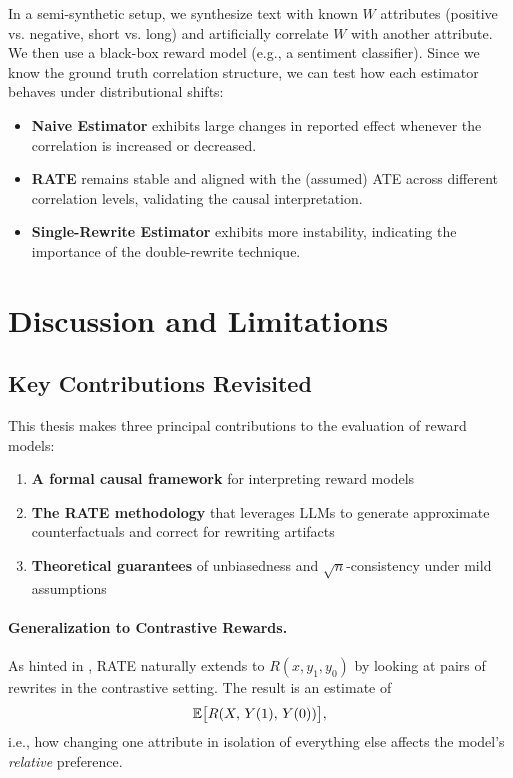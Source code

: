In a semi-synthetic setup, we synthesize text with known $W$ attributes (positive vs. negative, short vs. long) and artificially correlate $W$ with another attribute. We then use a black-box reward model (e.g., a sentiment classifier). Since we know the ground truth correlation structure, we can test how each estimator behaves under distributional shifts:
\begin{itemize}
    \item \textbf{Naive Estimator} exhibits large changes in reported effect whenever the correlation is increased or decreased.
    \item \textbf{RATE} remains stable and aligned with the (assumed) ATE across different correlation levels, validating the causal interpretation.
    \item \textbf{Single-Rewrite Estimator} exhibits more instability, indicating the importance of the double-rewrite technique.
\end{itemize}

\section{Discussion and Limitations}
\label{sec:discussion}

\subsection{Key Contributions Revisited}

This thesis makes three principal contributions to the evaluation of reward models:

\begin{enumerate}
    \item \textbf{A formal causal framework} for interpreting reward models

    \item \textbf{The RATE methodology} that leverages LLMs to generate approximate counterfactuals and correct for rewriting artifacts

    \item \textbf{Theoretical guarantees} of unbiasedness and $\sqrt{n}$-consistency under mild assumptions
\end{enumerate}

\paragraph{Generalization to Contrastive Rewards.}
As hinted in , RATE naturally extends to $R(x, y_1, y_0)$ by looking at pairs of rewrites in the contrastive setting. The result is an estimate of
\[
\mathbb{E}\bigl[R(X,\,Y(1),\,Y(0))\bigr],
\]
i.e., how changing one attribute in isolation of everything else affects the model's \emph{relative} preference.


